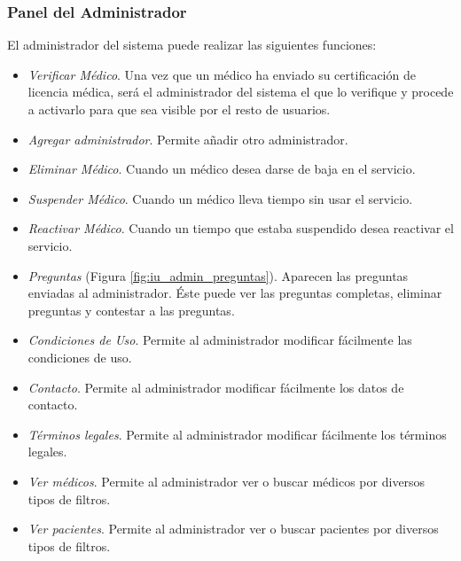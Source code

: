 		
	\subsubsection{Panel del Administrador} %
		\label{sub:panel_administrador}
	
		El administrador del sistema puede realizar las siguientes funciones:
		
		\begin{itemize}
			\item \textit{Verificar Médico}. Una vez que un médico ha enviado su certificación de licencia médica, será el administrador del sistema el que lo verifique y procede a activarlo para que sea visible por el resto de usuarios.
			\item \textit{Agregar administrador}. Permite añadir otro administrador.
			\item \textit{Eliminar Médico}. Cuando un médico desea darse de baja en el servicio.
			\item \textit{Suspender Médico}. Cuando un médico lleva tiempo sin usar el servicio.
			\item \textit{Reactivar Médico}. Cuando un tiempo que estaba suspendido desea reactivar el servicio.
			\item \textit{Preguntas} (Figura \ref{fig:iu_admin_preguntas}). Aparecen las preguntas enviadas al administrador. Éste puede ver las preguntas completas, eliminar preguntas y contestar a las preguntas.
			\item \textit{Condiciones de Uso}. Permite al administrador modificar fácilmente las condiciones de uso.
			\item \textit{Contacto}. Permite al administrador modificar fácilmente los datos de contacto.
			\item \textit{Términos legales}. Permite al administrador modificar fácilmente los términos legales.
			\item \textit{Ver médicos}. Permite al administrador ver o buscar médicos por diversos tipos de filtros.
			\item \textit{Ver pacientes}. Permite al administrador ver o buscar pacientes por diversos tipos de filtros.
		\end{itemize}
	
